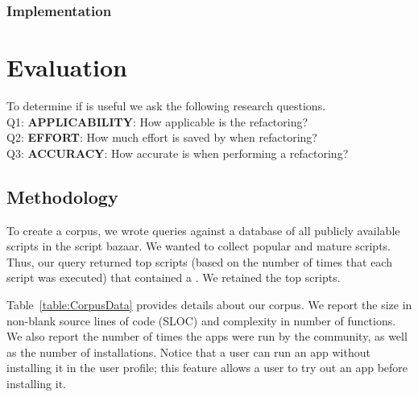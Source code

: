\documentclass[article]{sigplanconf}
\begin{document}

\subsubsection{Implementation}


\section{Evaluation}
\label{sec:evaluation}
To determine if \tool is useful we ask the following research questions.\\
Q1:  \textbf{APPLICABILITY}:  How applicable is the refactoring?\\
Q2:  \textbf{EFFORT}: How much effort is saved by \tool when refactoring?\\
Q3:  \textbf{ACCURACY}: How accurate is \tool when performing a refactoring?\\
 
\subsection{Methodology}

To create a corpus, we wrote queries against a database of all publicly available scripts in the \TD script bazaar. We wanted to collect popular and mature scripts. 
Thus, our query returned top scripts (based on the number of times that each script was executed) 
that contained a \NC{}. We retained the top \numScripts scripts.

Table~\ref{table:CorpusData} provides details about our corpus.  We report the size in non-blank source lines of code (SLOC) and complexity in number of functions.  We also report the number of times the apps were run by the \TD community, as well as the number of installations. Notice that a user can run an app without installing it in the user profile; this feature allows a \TD user to try out an app before installing it.
\end{document}
